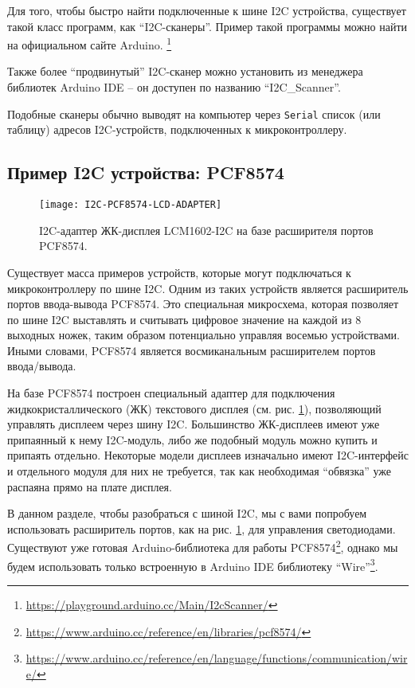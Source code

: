 \documentclass[../sparc.tex]{subfiles}
\begin{document}
Для того, чтобы быстро найти подключенные к шине \gls{I2C} устройства,
существует такой класс программ, как ``I2C-сканеры''.  Пример такой программы
можно найти на официальном сайте
Arduino. \footnote{\url{https://playground.arduino.cc/Main/I2cScanner/}}

Также более ``продвинутый'' I2C-сканер можно установить из менеджера библиотек
Arduino IDE -- он доступен по названию ``I2C\_Scanner''.

Подобные сканеры обычно выводят на компьютер через \texttt{Serial} список (или
таблицу) адресов I2C-устройств, подключенных к микроконтроллеру.

\subsection{Пример I2C устройства: PCF8574}

\begin{figure}[H]
  \centering
  \texttt{[image: I2C-PCF8574-LCD-ADAPTER]}
  \caption{I2C-адаптер ЖК-дисплея LCM1602-I2C на базе расширителя портов
    PCF8574.}
  \label{fig:i2c-pcf8574-lcd-adapter}
\end{figure}

Существует масса примеров устройств, которые могут подключаться к
микроконтроллеру по шине \gls{I2C}.  Одним из таких устройств является
расширитель портов ввода-вывода PCF8574.  Это специальная микросхема, которая
позволяет по шине I2C выставлять и считывать цифровое значение на каждой из 8
выходных ножек, таким образом потенциально управляя восемью устройствами.  Иными
словами, PCF8574 является восмиканальным расширителем портов ввода/вывода.

На базе PCF8574 построен специальный адаптер для подключения
жидкокристаллического (ЖК) текстового дисплея
(см. рис. \ref{fig:i2c-pcf8574-lcd-adapter}), позволяющий управлять дисплеем
через шину I2C.  Большинство ЖК-дисплеев имеют уже припаянный к нему I2C-модуль,
либо же подобный модуль можно купить и припаять отдельно.  Некоторые модели
дисплеев изначально имеют I2C-интерфейс и отдельного модуля для них не
требуется, так как необходимая ``обвязка'' уже распаяна прямо на плате дисплея.

В данном разделе, чтобы разобраться с шиной I2C, мы с вами попробуем
использовать расширитель портов, как на рис. \ref{fig:i2c-pcf8574-lcd-adapter},
для управления светодиодами.  Существуют уже готовая Arduino-библиотека для
работы
PCF8574\footnote{\url{https://www.arduino.cc/reference/en/libraries/pcf8574/}},
однако мы будем использовать только встроенную в Arduino IDE библиотеку
``Wire''\footnote{\url{https://www.arduino.cc/reference/en/language/functions/communication/wire/}}.
\end{document}
